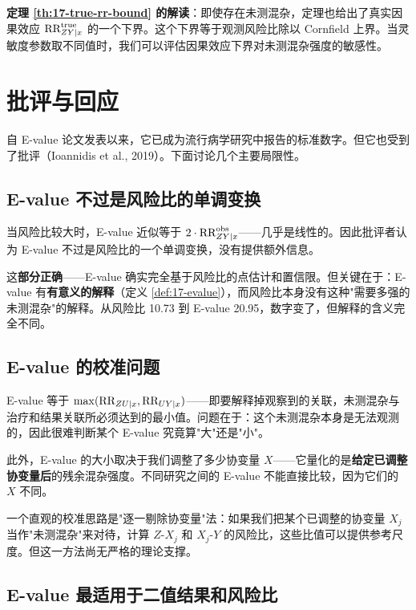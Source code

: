 \textbf{定理 \ref{th:17-true-rr-bound} 的解读}：即使存在未测混杂，定理也给出了真实因果效应 $\text{RR}_{ZY\mid x}^{\mathrm{true}}$ 的一个下界。这个下界等于观测风险比除以 Cornfield 上界。当灵敏度参数取不同值时，我们可以评估因果效应下界对未测混杂强度的敏感性。

\section{批评与回应}\label{sec:17-critiques}

自 E-value 论文发表以来，它已成为流行病学研究中报告的标准数字。但它也受到了批评（Ioannidis et al., 2019）。下面讨论几个主要局限性。

\subsection{E-value 不过是风险比的单调变换}\label{sec:17-critique-monotone}

当风险比较大时，E-value 近似等于 $2 \cdot \text{RR}_{ZY\mid x}^{\mathrm{obs}}$——几乎是线性的。因此批评者认为 E-value 不过是风险比的一个单调变换，没有提供额外信息。

这\textbf{部分正确}——E-value 确实完全基于风险比的点估计和置信限。但关键在于：E-value 有\textbf{有意义的解释}（定义 \ref{def:17-evalue}），而风险比本身没有这种"需要多强的未测混杂"的解释。从风险比 10.73 到 E-value 20.95，数字变了，但解释的含义完全不同。

\subsection{E-value 的校准问题}\label{sec:17-critique-calibration}

E-value 等于 $\max(\text{RR}_{ZU\mid x}, \text{RR}_{UY\mid x})$——即要解释掉观察到的关联，未测混杂与治疗和结果关联所必须达到的最小值。问题在于：这个未测混杂本身是无法观测的，因此很难判断某个 E-value 究竟算"大"还是"小"。

此外，E-value 的大小取决于我们调整了多少协变量 $X$——它量化的是\textbf{给定已调整协变量后}的残余混杂强度。不同研究之间的 E-value 不能直接比较，因为它们的 $X$ 不同。

一个直观的校准思路是"逐一剔除协变量"法：如果我们把某个已调整的协变量 $X_j$ 当作"未测混杂"来对待，计算 $Z\text{-}X_j$ 和 $X_j\text{-}Y$ 的风险比，这些比值可以提供参考尺度。但这一方法尚无严格的理论支撑。

\subsection{E-value 最适用于二值结果和风险比}\label{sec:17-critique-binary-only}

